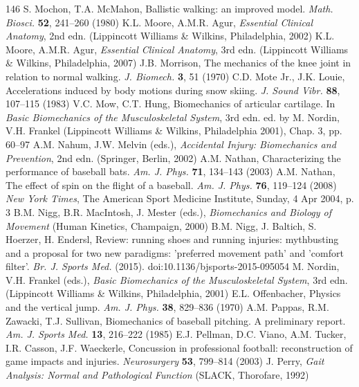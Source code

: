 \documentclass[12pt]{book}
\begin{document}
\begin{thebibliography}{146}
 S. Mochon, T.A. McMahon, Ballistic walking: an improved model. \textit{Math. Biosci.} \textbf{52}, 241--260 (1980)
 K.L. Moore, A.M.R. Agur, \textit{Essential Clinical Anatomy}, 2nd edn. (Lippincott Williams \& Wilkins, Philadelphia, 2002)
 K.L. Moore, A.M.R. Agur, \textit{Essential Clinical Anatomy}, 3rd edn. (Lippincott Williams \& Wilkins, Philadelphia, 2007)
 J.B. Morrison, The mechanics of the knee joint in relation to normal walking. \textit{J. Biomech.} \textbf{3}, 51 (1970)
 C.D. Mote Jr., J.K. Louie, Accelerations induced by body motions during snow skiing. \textit{J. Sound Vibr.} \textbf{88}, 107--115 (1983)
 V.C. Mow, C.T. Hung, Biomechanics of articular cartilage. In \textit{Basic Biomechanics of the Musculoskeletal System}, 3rd edn. ed. by M. Nordin, V.H. Frankel (Lippincott Williams \& Wilkins, Philadelphia 2001), Chap. 3, pp. 60--97
 A.M. Nahum, J.W. Melvin (eds.), \textit{Accidental Injury: Biomechanics and Prevention}, 2nd edn. (Springer, Berlin, 2002)
 A.M. Nathan, Characterizing the performance of baseball bats. \textit{Am. J. Phys.} \textbf{71}, 134--143 (2003)
 A.M. Nathan, The effect of spin on the flight of a baseball. \textit{Am. J. Phys.} \textbf{76}, 119--124 (2008)
 \textit{New York Times}, The American Sport Medicine Institute, Sunday, 4 Apr 2004, p. 3
 B.M. Nigg, B.R. MacIntosh, J. Mester (eds.), \textit{Biomechanics and Biology of Movement} (Human Kinetics, Champaign, 2000)
 B.M. Nigg, J. Baltich, S. Hoerzer, H. Endersl, Review: running shoes and running injuries: mythbusting and a proposal for two new paradigms: 'preferred movement path' and 'comfort filter'. \textit{Br. J. Sports Med.} (2015). doi:10.1136/bjsports-2015-095054
 M. Nordin, V.H. Frankel (eds.), \textit{Basic Biomechanics of the Musculoskeletal System}, 3rd edn. (Lippincott Williams \& Wilkins, Philadelphia, 2001)
 E.L. Offenbacher, Physics and the vertical jump. \textit{Am. J. Phys.} \textbf{38}, 829--836 (1970)
 A.M. Pappas, R.M. Zawacki, T.J. Sullivan, Biomechanics of baseball pitching. A preliminary report. \textit{Am. J. Sports Med.} \textbf{13}, 216--222 (1985)
 E.J. Pellman, D.C. Viano, A.M. Tucker, I.R. Casson, J.F. Waeckerle, Concussion in professional football: reconstruction of game impacts and injuries. \textit{Neurosurgery} \textbf{53}, 799--814 (2003)
 J. Perry, \textit{Gait Analysis: Normal and Pathological Function} (SLACK, Thorofare, 1992)

\end{thebibliography}
\end{document}
